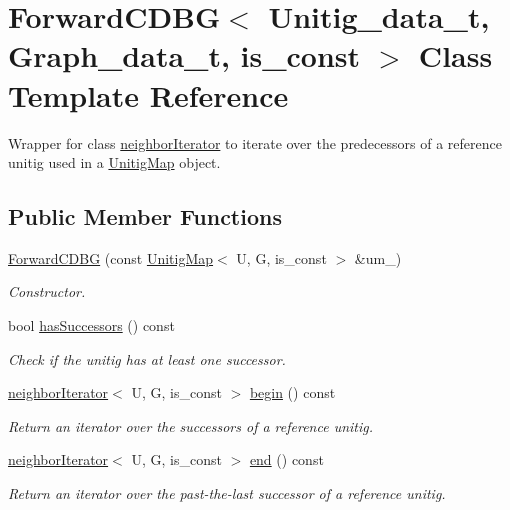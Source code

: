\hypertarget{classForwardCDBG}{}\section{Forward\+C\+D\+BG$<$ Unitig\+\_\+data\+\_\+t, Graph\+\_\+data\+\_\+t, is\+\_\+const $>$ Class Template Reference}
\label{classForwardCDBG}


Wrapper for class \hyperlink{classneighborIterator}{neighbor\+Iterator} to iterate over the predecessors of a reference unitig used in a \hyperlink{classUnitigMap}{Unitig\+Map} object.  


\subsection*{Public Member Functions}
\begin{DoxyCompactItemize}
\item 
\hyperlink{classForwardCDBG_ae4cc2b8a705fb9555fba4f31bfcc7bdb}{Forward\+C\+D\+BG} (const \hyperlink{classUnitigMap}{Unitig\+Map}$<$ U, G, is\+\_\+const $>$ \&um\+\_\+)
\begin{DoxyCompactList}\small\item\em Constructor. \end{DoxyCompactList}\item 
bool \hyperlink{classForwardCDBG_a17b11e73f1754c52ff4bb771bdefca08}{has\+Successors} () const
\begin{DoxyCompactList}\small\item\em Check if the unitig has at least one successor. \end{DoxyCompactList}\item 
\hyperlink{classneighborIterator}{neighbor\+Iterator}$<$ U, G, is\+\_\+const $>$ \hyperlink{classForwardCDBG_a18fd34268b50793eabde303c3e9ed5db}{begin} () const
\begin{DoxyCompactList}\small\item\em Return an iterator over the successors of a reference unitig. \end{DoxyCompactList}\item 
\hyperlink{classneighborIterator}{neighbor\+Iterator}$<$ U, G, is\+\_\+const $>$ \hyperlink{classForwardCDBG_a83c2f8b929022aa77289177ec5ce7869}{end} () const
\begin{DoxyCompactList}\small\item\em Return an iterator over the past-\/the-\/last successor of a reference unitig. \end{DoxyCompactList}\end{DoxyCompactItemize}


